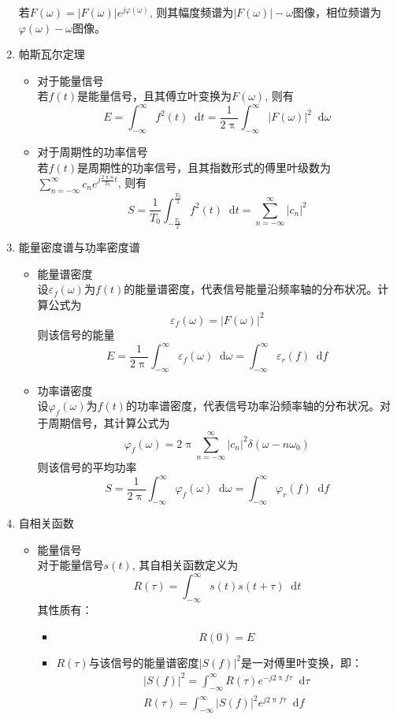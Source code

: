 \documentclass[UTF8]{ctexrep}
\renewcommand{\epsilon}{\varepsilon}
\renewcommand{\phi}{\varphi}
\newcommand{\ext}{\displaystyle}
\newcommand{\dif}{\mathop{}\!{}\mathrm{d}}
\def\abs#1{\left| #1 \right|}
\def\pth#1{\left( {#1}\right)}
\begin{document}
\begin{enumerate}
若$F(\omega)=\abs{F(\omega)}e^{j\phi(\omega)}$, 则其幅度频谱为$\abs{F(\omega)}-\omega$图像，相位频谱为$\phi(\omega)-\omega$图像。
\item 帕斯瓦尔定理
\begin{itemize}
\item 对于能量信号\\
若$f(t)$是能量信号，且其傅立叶变换为$F(\omega)$, 则有
\[E=\int_{-\infty}^{\infty}f^2(t)\dif t=\frac{1}{2\uppi}\int_{-\infty}^{\infty}\abs{F(\omega)}^2\dif\omega\]
\item 对于周期性的功率信号\\
若$f(t)$是周期性的功率信号，且其指数形式的傅里叶级数为$\ext\sum_{n=-\infty}^{\infty}c_ne^{j\frac{2\uppi n}{T_0}t}$, 则有
\[S=\frac{1}{T_0}\int_{-\frac{T_0}{2}}^{\frac{T_0}{2}}f^2(t)\dif t=\sum_{n=-\infty}^{\infty}\abs{c_n}^2\]
\end{itemize}
\item 能量密度谱与功率密度谱
\begin{itemize}
\item 能量谱密度\\
设$\epsilon_f(\omega)$为$f(t)$的能量谱密度，代表信号能量沿频率轴的分布状况。计算公式为
\[\epsilon_f(\omega )=\abs{F(\omega)}^2\]
则该信号的能量
\[E=\frac{1}{2\uppi}\int_{-\infty}^{\infty}\epsilon_f(\omega)\dif\omega=\int_{-\infty}^{\infty}\epsilon_r(f)\dif f\]
\item 功率谱密度\\
设$\phi_f(\omega)$为$f(t)$的功率谱密度，代表信号功率沿频率轴的分布状况。对于周期信号，其计算公式为
\[\phi_f(\omega)=2\uppi\sum_{n=-\infty}^{\infty}\abs{c_n}^2\delta\pth{\omega-n\omega_0}\]
则该信号的平均功率
\[S=\frac{1}{2\uppi}\int_{-\infty}^{\infty}\phi_f(\omega)\dif\omega=\int_{-\infty}^{\infty}\phi_r(f)\dif f\]
\end{itemize}
\item 自相关函数
\begin{itemize}
\item 能量信号\\
对于能量信号$s(t)$, 其自相关函数定义为
\[R(\tau)=\int_{-\infty}^{\infty}s(t)s(t+\tau)\dif t\]
其性质有：
\begin{itemize}
\item \[R(0)=E\]
\item $R(\tau)$与该信号的能量谱密度$\abs{S(f)}^2$是一对傅里叶变换，即：
\begin{gather*}
\abs{S(f)}^2=\int_{-\infty}^{\infty}R(\tau)e^{-j2\uppi f\tau}\dif \tau\\
R(\tau)=\int_{-\infty}^{\infty}\abs{S(f)}^2e^{j2\uppi f\tau}\dif f

\end{gather*}
\end{itemize}
\end{itemize}
\end{enumerate}
\end{document}
